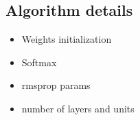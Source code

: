 \begin{appendices}
\chapter{Algorithm details}
\begin{itemize}
    \item Weights initialization
    \item Softmax
    \item rmsprop params
    \item number of layers and units
\end{itemize}
\end{appendices}